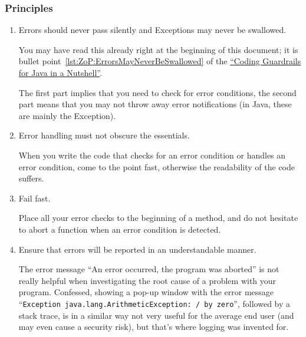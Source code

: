 \documentclass[11pt,a4paper, titlepage, parskip=half, headsepline, footsepline, cleardoublepage=current, headheight=1cm]{scrbook}
\newcommand*{\ngref}{\hyperref[lst:NutshellGuardrails]{“Coding Guardrails for Java in a Nutshell”}}
\begin{document}
\subsubsection{Principles}
\begin{enumerate}[label=P\arabic*.]
\item{Errors should never pass silently and Exceptions may never be swallowed.

You may have read this already right at the beginning of this document; it is bullet point~\ref{lst:ZoP:ErrorsMayNeverBeSwallowed} of the \ngref.

The first part implies that you need to check for error conditions, the second part means that you may not throw away error notifications (in Java, these are mainly the Exception).}

\item{Error handling must not obscure the essentials.

When you write the code that checks for an error condition or handles an error condition, come to the point fast, otherwise the readability of the code suffers.}

\item{Fail fast.

Place all your error checks to the beginning of a method, and do not hesitate to abort a function when an error condition is detected.}

\item{Ensure that errors will be reported in an understandable manner.

The error message “An error occurred, the program was aborted” is not really helpful when investigating the root cause of a problem with your program. Confessed, showing a pop-up window with the error message “\verb#Exception java.lang.ArithmeticException: / by zero#”, followed by a stack trace, is in a similar way not very useful for the average end user (and may even cause a security risk), but that's where logging was invented for.}
\end{enumerate}

\end{document}

